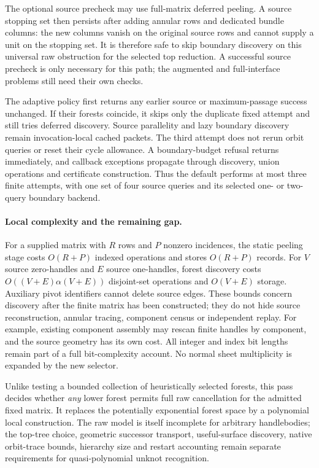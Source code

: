 The optional source precheck may use full-matrix deferred peeling. A
source stopping set then persists after adding annular rows and dedicated
bundle columns: the new columns vanish on the original source rows and
cannot supply a unit on the stopping set. It is therefore safe to skip
boundary discovery on this universal raw obstruction for the selected top
reduction. A successful source precheck is only necessary for this path;
the augmented and full-interface problems still need their own checks.

The adaptive policy first returns any earlier source or maximum-passage
success unchanged. If their forests coincide, it skips only the duplicate
fixed attempt and still tries deferred discovery. Source parallelity and
lazy boundary discovery remain invocation-local cached packets. The third
attempt does not rerun orbit queries or reset their cycle allowance.
A boundary-budget refusal returns immediately, and callback exceptions
propagate through discovery, union operations and certificate construction.
Thus the default performs at most three finite attempts, with one set of
four source queries and its selected one- or two-query boundary backend.

\paragraph{Local complexity and the remaining gap.}
For a supplied matrix with $R$ rows and $P$ nonzero incidences, the static
peeling stage costs $O(R+P)$ indexed operations and stores $O(R+P)$ records.
For $V$ source zero-handles and $E$ source one-handles, forest discovery
costs $O((V+E)\alpha(V+E))$ disjoint-set operations and $O(V+E)$ storage.
Auxiliary pivot identifiers cannot delete source edges. These bounds
concern discovery after the finite matrix has been constructed; they do
not hide source reconstruction, annular tracing, component census or
independent replay. For example, existing component assembly may rescan
finite handles by component, and the source geometry has its own cost.
All integer and index bit lengths remain part of a full bit-complexity
account. No normal sheet multiplicity is expanded by the new selector.

Unlike testing a bounded collection of heuristically selected forests,
this pass decides whether \emph{any} lower forest permits full raw
cancellation for the admitted fixed matrix. It replaces the potentially
exponential forest space by a polynomial local construction. The raw
model is itself incomplete for arbitrary handlebodies; the top-tree
choice, geometric successor transport, useful-surface discovery, native
orbit-trace bounds, hierarchy size and restart accounting remain separate
requirements for quasi-polynomial unknot recognition.


